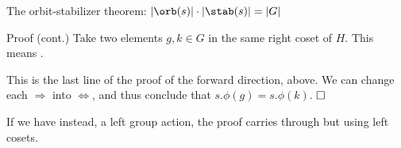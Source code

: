 \documentclass[8pt, handout]{beamer}
\newcommand{\Pause}{}      %
\begin{document}
\begin{frame}{The orbit-stabilizer theorem: $|\orb(s)|\cdot|\stab(s)|=|G|$}
\begin{exampleblock}{Proof (cont.)}
    Take two elements $g,k\in G$ in the same right coset of $H$. \Pause
    This means . 
    
    \medskip\pause
    
    This is the last line of the proof of the forward direction,
    above. \Pause We can change each $\Longrightarrow$ into
    $\Longleftrightarrow$, and thus conclude that
    $s.\phi(g)=s.\phi(k)$. $\hfill\Box$
  \end{exampleblock}
  
  \smallskip\Pause
  
  If we have instead, a {\color{xBlue}left group action}, the
  proof carries through but using left cosets.
  
\end{frame}

\end{document}

